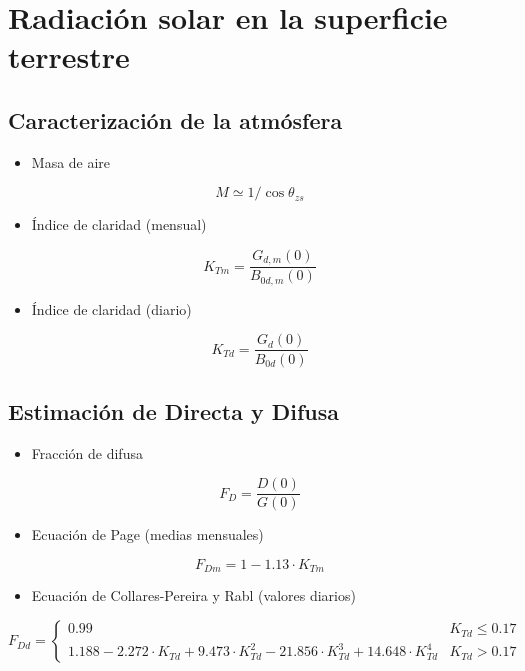 \documentclass[article, a4paper]{memoir}
\begin{document}
\section{Radiación solar en la superficie terrestre}
\label{sec:org7d1dc90}
\subsection{Caracterización de la atmósfera}
\label{sec:org374dbbe}

\begin{itemize}
\item Masa de aire
\end{itemize}

\[
   M \simeq 1/\cos\theta_{zs}
\]

\begin{itemize}
\item Índice de claridad (mensual)
\end{itemize}
\[
K_{Tm}=\frac{G_{d,m}(0)}{B_{0d,m}(0)}
\]

\begin{itemize}
\item Índice de claridad (diario)
\end{itemize}
\[
K_{Td}=\frac{G_d(0)}{B_{0d}(0)}
\]

\subsection{Estimación de Directa y Difusa}
\label{sec:orgaac5bd7}

\begin{itemize}
\item Fracción de difusa
\end{itemize}
\[
F_{D}=\frac{D(0)}{G(0)}
\]

\begin{itemize}
\item Ecuación de Page (medias mensuales)
\end{itemize}

\[
F_{Dm}=1-1.13\cdot K_{Tm}
\]
\begin{itemize}
\item Ecuación de Collares-Pereira y Rabl (valores diarios)
\end{itemize}

\[
F_{Dd} = \begin{cases}
  0.99 & K_{Td} \leq 0.17\\
  1.188 - 2.272 \cdot K_{Td} + 9.473 \cdot K_{Td}^{2} - 21.856 \cdot K_{Td}^{3} + 14.648 \cdot K_{Td}^{4} & K_{Td} > 0.17
\end{cases}
\]
\end{document}
